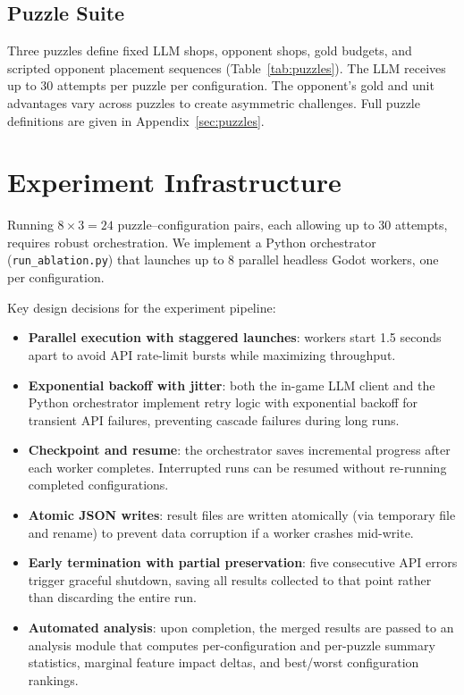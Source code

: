 \documentclass[11pt]{article}
\begin{document}
\subsection{Puzzle Suite}

Three puzzles define fixed LLM shops, opponent shops, gold budgets, and scripted opponent placement sequences (Table~\ref{tab:puzzles}).
The LLM receives up to 30 attempts per puzzle per configuration.
The opponent's gold and unit advantages vary across puzzles to create asymmetric challenges.
Full puzzle definitions are given in Appendix~\ref{sec:puzzles}.

\section{Experiment Infrastructure}\label{sec:infra}

Running $8 \times 3 = 24$ puzzle--configuration pairs, each allowing up to 30 attempts, requires robust orchestration.
We implement a Python orchestrator (\texttt{run\_ablation.py}) that launches up to 8 parallel headless Godot workers, one per configuration.

Key design decisions for the experiment pipeline:
\begin{itemize}[nosep]
    \item \textbf{Parallel execution with staggered launches}: workers start 1.5 seconds apart to avoid API rate-limit bursts while maximizing throughput.
    \item \textbf{Exponential backoff with jitter}: both the in-game LLM client and the Python orchestrator implement retry logic with exponential backoff for transient API failures, preventing cascade failures during long runs.
    \item \textbf{Checkpoint and resume}: the orchestrator saves incremental progress after each worker completes. Interrupted runs can be resumed without re-running completed configurations.
    \item \textbf{Atomic JSON writes}: result files are written atomically (via temporary file and rename) to prevent data corruption if a worker crashes mid-write.
    \item \textbf{Early termination with partial preservation}: five consecutive API errors trigger graceful shutdown, saving all results collected to that point rather than discarding the entire run.
    \item \textbf{Automated analysis}: upon completion, the merged results are passed to an analysis module that computes per-configuration and per-puzzle summary statistics, marginal feature impact deltas, and best/worst configuration rankings.
\end{itemize}
\end{document}
